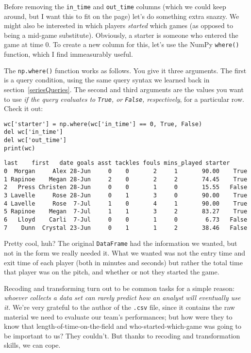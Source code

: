 



Before removing the \texttt{in\_time} and \texttt{out\_time} columns (which we
could keep around, but I want this to fit on the page) let's do something extra
snazzy. We might also be interested in which players \textit{started} which
games (as opposed to being a mid-game substitute). Obviously, a starter is
someone who entered the game at time 0. To create a new column for this, let's
use the NumPy \texttt{where()} function, which I find immeasurably useful.

The \texttt{np.where()} function works as follows. You give it three arguments.
The first is a query condition, using the same query syntax we learned back in
section~\ref{seriesQueries}. The second and third arguments are the values you
want to use \textit{if the query evaluates to \texttt{True}, or \texttt{False},
respectively}, for a particular row. Check it out:

\begin{samepage}
\begin{Verbatim}[fontsize=\small,samepage=true,frame=single,framesep=3mm]
wc['starter'] = np.where(wc['in_time'] == 0, True, False)
del wc['in_time']
del wc['out_time']
print(wc)
\end{Verbatim}
\end{samepage}

\begin{Verbatim}[fontsize=\footnotesize,samepage=true,frame=leftline,framesep=5mm,framerule=1mm]
     last    first   date goals asst tackles fouls mins_played starter
0  Morgan     Alex 28-Jun     0    0       2     1       90.00    True
1 Rapinoe    Megan 28-Jun     2    0       2     2       74.45    True
2   Press Christen 28-Jun     0    0       1     0       15.55   False
3 Lavelle     Rose 28-Jun     0    1       3     0       90.00    True
4 Lavelle     Rose  7-Jul     1    0       4     1       90.00    True
5 Rapinoe    Megan  7-Jul     1    1       3     2       83.27    True
6   Lloyd    Carli  7-Jul     0    0       1     0        6.73   False
7    Dunn  Crystal 23-Jun     0    1       1     2       38.46   False
\end{Verbatim}

Pretty cool, huh? The original \texttt{DataFrame} had the information we
wanted, but not in the form we really needed it. What we wanted was not the
entry time and exit time of each player (both in minutes and seconds) but
rather the total time that player was on the pitch, and whether or not they
started the game.

Recoding and transforming turn out to be common tasks for a simple reason:
\textit{whoever collects a data set can rarely predict how an analyst will
eventually use it.} We're very grateful to the author of the \texttt{.csv}
file, since it contains the raw material we need to evaluate our team's
performances; but how were they to know that length-of-time-on-the-field and
who-started-which-game was going to be important to us? They couldn't. But
thanks to recoding and transformation skills, we can cope.

